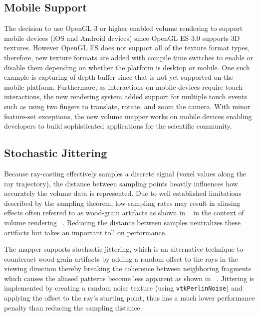 \subsection{Mobile Support}
The decision to use OpenGL 3 or higher enabled volume rendering to support
mobile devices (iOS and Android devices) since OpenGL ES 3.0 supports 3D textures.
However OpenGL ES does not support all of the texture format types, therefore,
new texture formats are added with compile time switches to enable or
disable them depending on whether the platform is desktop or mobile. One such
example is capturing of depth buffer since that is not yet supported on the
mobile platform.  Furthermore, as interactions on mobile devices require touch
interactions, the new rendering system added support for multiple touch events
such as using two fingers to translate, rotate, and zoom the camera. With minor
feature-set exceptions, the new volume mapper works on mobile devices enabling
developers to build sophisticated applications for the scientific community.

\subsection{Stochastic Jittering}
Because ray-casting effectively samples a discrete signal (voxel values along
the ray trajectory), the distance between sampling points heavily
influences how accurately the volume data is represented.  Due to well
established limitations described by the sampling theorem, low sampling rates
may result in aliasing effects often referred to as wood-grain artifacts
as shown in ~ in the context of volume rendering
~\citep{engel_real-time_2006}. Reducing the distance between samples
neutralizes these artifacts but takes an important toll on performance.

The mapper supports stochastic jittering, which is an alternative technique to
counteract wood-grain artifacts by adding a random offset to the rays in the
viewing direction thereby breaking the coherence between neighboring fragments
which causes the aliased patterns become less apparent
as shown in ~.  Jittering is implemented by creating a
random noise texture (using \texttt{vtkPerlinNoise}) and applying the offset to
the ray's starting point, thus has a much lower performance penalty than
reducing the sampling distance.

